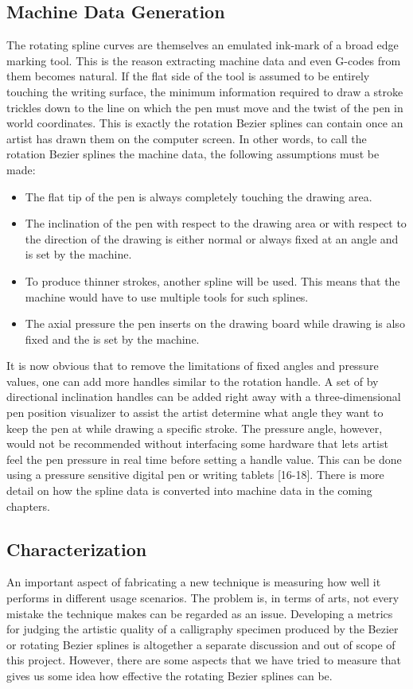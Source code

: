 \subsection{Machine Data Generation}
The rotating spline curves are themselves an emulated ink-mark of a broad edge marking tool. This is the reason extracting machine data and even G-codes from them becomes natural. If the flat side of the tool is assumed to be entirely touching the writing surface, the minimum information required to draw a stroke trickles down to the line on which the pen must move and the twist of the pen in world coordinates. This is exactly the rotation Bezier splines can contain once an artist has drawn them on the computer screen. In other words, to call the rotation Bezier splines the machine data, the following assumptions must be made:
\begin{itemize}
	\item The flat tip of the pen is always completely touching the drawing area.
	\item The inclination of the pen with respect to the drawing area or with respect to the direction of the drawing is either normal or always fixed at an angle and is set by the machine.
	\item To produce thinner strokes, another spline will be used. This means that the machine would have to use multiple tools for such splines.
	\item The axial pressure the pen inserts on the drawing board while drawing is also fixed and the is set by the machine.
\end{itemize}

It is now obvious that to remove the limitations of fixed angles and pressure values, one can add more handles similar to the rotation handle. A set of by directional inclination handles can be added right away with a three-dimensional pen position visualizer to assist the artist determine what angle they want to keep the pen at while drawing a specific stroke. The pressure angle, however, would not be recommended without interfacing some hardware that lets artist feel the pen pressure in real time before setting a handle value. This can be done using a pressure sensitive digital pen or writing tablets [16-18].
There is more detail on how the spline data is converted into machine data in the coming chapters.

\subsection{Characterization}
An important aspect of fabricating a new technique is measuring how well it performs in different usage scenarios. The problem is, in terms of arts, not every mistake the technique makes can be regarded as an issue. Developing a metrics for judging the artistic quality of a calligraphy specimen produced by the Bezier or rotating Bezier splines is altogether a separate discussion and out of scope of this project. However, there are some aspects that we have tried to measure that gives us some idea how effective the rotating Bezier splines can be.


